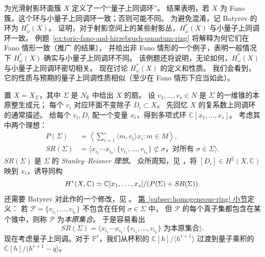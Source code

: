 \begin{example}\label{ex:batyrev-quantum-ring}
 为光滑射影环面簇 $X$ 定义了一个“量子上同调环”。
结果表明，若 $X$ 为 Fano 簇，这个环与小量子上同调环一致；否则可能不同。
为避免混淆，记 Batyrev 的环为 $H_\omega^*(X)$。
 证明，对于射影空间上的某些射影丛，$H_\omega^*(X)$ 与小量子上同调环一致。
例题~\ref{ex:toric-fano-and-hirzebruch-quantum-ring} 将解释为何它们在 Fano 情形一致（推广  的结果），
并给出非 Fano 情形的一个例子，表明一般情况下 $H_\omega^*(X)$ 确实与小量子上同调环不同。
该例题还将说明，无论如何，$H_\omega^*(X)$ 与小量子上同调环密切相关。
现在讨论 $H_\omega^*(X)$ 的定义和性质。
我们会看到，它的性质与预期的量子上同调性质相似（至少在 Fano 情形下应当如此）。

置 $X=X_\Sigma$，其中 $\Sigma$ 是 $N_{\mathbb R}$ 中给出 $X$ 的扇。
设 $v_1,\ldots,v_s\in N$ 是 $\Sigma$ 的一维锥的本原整生成元；
每个 $v_i$ 对应环面不变除子 $D_i\subset X$。
先回忆 $X$ 的复系数上同调环的通常描述。
给每个 $v_i,D_i$ 配一个变量 $x_i$，得到多项式环 $\mathbb C[x_1,\ldots,x_s]$。
考虑其中两个理想：
\[
\begin{aligned}
P(\Sigma)&=\left\langle\sum_{i=1}^s\langle m,v_i\rangle x_i:m\in M\right\rangle,\\
SR(\Sigma)&=\langle x_{i_1}\cdots x_{i_k}:\{v_{i_1},\ldots,v_{i_k}\}\not\subset\sigma
\text{，对所有 }\sigma\in\Sigma\rangle.
\end{aligned}
\]
$SR(\Sigma)$ 是 $\Sigma$ 的 \emph{Stanley--Reisner 理想}。
众所周知，见 ，将 $[D_i]\in H^2(X,\mathbb C)$ 映到 $x_i$，诱导同构
\begin{equation}\label{eq:toric-cohomology-sr}
\index{Stanley--Reisner理想@Stanley--Reisner 理想|hyperpage}
H^*(X,\mathbb C)\simeq\mathbb C[x_1,\ldots,x_s]/(P(\Sigma)+SR(\Sigma)).
\end{equation}
还需要 Batyrev 对此作的一个修改，见 。
\hyperref[subsec:homogeneous-ring]{第~\ref*{subsec:homogeneous-ring} 小节}定义：
若 $\mathcal P=\{v_{i_1},\ldots,v_{i_k}\}$ 不包含在任何 $\sigma\in\Sigma$ 中，
但 $\mathcal P$ 的每个真子集都包含在某个锥中，则称 $\mathcal P$ 为\emph{本原集合}。
于是容易看出
\begin{equation}\label{eq:sr-primitive-collections}
SR(\Sigma)=\langle x_{i_1}\cdots x_{i_k}:\{v_{i_1},\ldots,v_{i_k}\}\text{ 为本原集合}\rangle.
\end{equation}
现在考虑量子上同调。对于 $\mathbb P^r$，我们从杯积的 $\mathbb C[h]/\langle h^{r+1}\rangle$
过渡到量子乘积的 $\mathbb C[h]/\langle h^{r+1}-q\rangle$。

\end{example}
